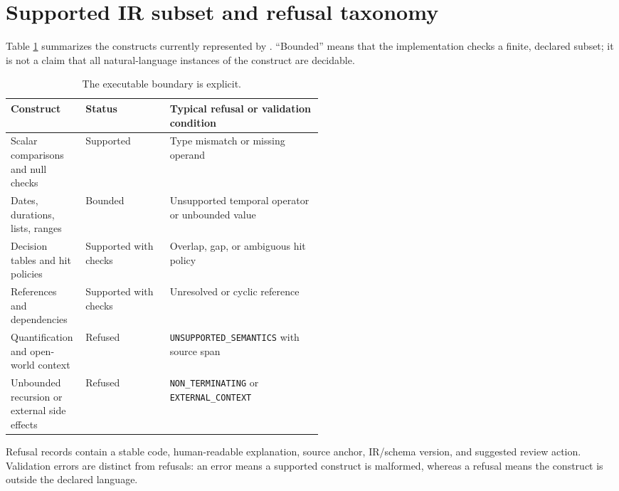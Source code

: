 \section{Supported IR subset and refusal taxonomy}

Table \ref{tab:ir-subset} summarizes the constructs currently represented by
\lexir{}. ``Bounded'' means that the implementation checks a finite, declared
subset; it is not a claim that all natural-language instances of the construct
are decidable.

\begin{table}[h]
\centering
\caption{The executable boundary is explicit.}
\label{tab:ir-subset}
\small
\begin{tabularx}{\linewidth}{@{}p{0.24\linewidth}p{0.27\linewidth}X@{}}
\toprule
Construct & Status & Typical refusal or validation condition \\
\midrule
Scalar comparisons and null checks & Supported & Type mismatch or missing operand \\
Dates, durations, lists, ranges & Bounded & Unsupported temporal operator or unbounded value \\
Decision tables and hit policies & Supported with checks & Overlap, gap, or ambiguous hit policy \\
References and dependencies & Supported with checks & Unresolved or cyclic reference \\
Quantification and open-world context & Refused & \texttt{UNSUPPORTED\_SEMANTICS} with source span \\
Unbounded recursion or external side effects & Refused & \texttt{NON\_TERMINATING} or \texttt{EXTERNAL\_CONTEXT} \\
\bottomrule
\end{tabularx}
\end{table}

Refusal records contain a stable code, human-readable explanation, source
anchor, IR/schema version, and suggested review action. Validation errors are
distinct from refusals: an error means a supported construct is malformed,
whereas a refusal means the construct is outside the declared language.
